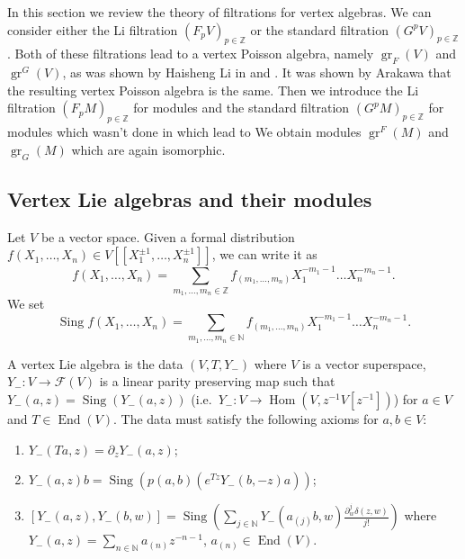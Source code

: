 \documentclass[a4paper, 12pt, reqno]{amsart}
\theoremstyle{remark}
\numberwithin{equation}{subsection}
\DeclareMathOperator{\gr}{gr}
\DeclareMathOperator{\End}{End}
\DeclareMathOperator{\Hom}{Hom}
\DeclareMathOperator{\Sing}{Sing}
\begin{document}
In this section we review the theory of filtrations for vertex algebras.
We can consider either the Li filtration $(F_pV)_{p \in \mathbb{Z}}$ or the standard filtration $(G^pV)_{p \in \mathbb{Z}}$.
Both of these filtrations lead to a vertex Poisson algebra, namely $\gr_F(V)$ and $\gr^G(V)$, as was shown by Haisheng Li in \cite{li_abelianizing_2005} and \cite{li_vertex_2004}.
It was shown by Arakawa \cite{arakawa_remark_2012} that the resulting vertex Poisson algebra is the same.
Then we introduce the Li filtration $(F_pM)_{p \in \mathbb{Z}}$ for modules and the standard filtration $(G^pM)_{p \in \mathbb{Z}}$ for modules which wasn't done in \cite{li_vertex_2004} which lead to 
We obtain modules $\gr^F(M)$ and $\gr_G(M)$ which are again isomorphic.

\subsection{Vertex Lie algebras and their modules}
\label{sec:vert-lie-algebr}

Let $V$ be a vector space.
Given a formal distribution $f(X_1, \dots, X_n) \in V[[X_1^{\pm 1}, \dots, X_n^{\pm 1}]]$, we can write it as
\begin{equation*}
  f(X_1, \dots, X_n) = \sum_{m_1, \dots, m_n \in \mathbb{Z}}f_{(m_1, \dots, m_n)}X_1^{-m_1 - 1}\dots X_n^{-m_n - 1}.
\end{equation*}
We set
\begin{equation*}
  \Sing f(X_1, \dots, X_n) = \sum_{m_1, \dots, m_n \in \mathbb{N}}f_{(m_1, \dots, m_n)}X_1^{-m_1 - 1}\dots X_n^{-m_n - 1}.
\end{equation*}

A vertex Lie algebra is the data $(V, T, Y_-)$ where $V$ is a vector superspace, $Y_-: V \to \mathcal{F}(V)$ is a linear parity preserving map such that $Y_-(a,z) = \Sing(Y_-(a, z))$ (i.e.\ $Y_-: V \to \Hom(V, z^{-1}V[z^{-1}])$) for $a \in V$ and $T \in \End(V)$.
The data must satisfy the following axioms for $a, b \in V$:
\begin{enumerate}
\item $Y_-(Ta, z) = \partial_zY_-(a, z)$;
\item $Y_-(a, z)b = \Sing(p(a, b)(e^{Tz}Y_-(b, -z)a))$;
\item $[Y_-(a, z),Y_-(b, w)] = \Sing(\sum_{j \in \mathbb{N}}Y_-(a_{(j)}b, w)\frac{\partial^j_w\delta(z, w)}{j!})$ where $Y_-(a, z) = \sum_{n \in \mathbb{N}}a_{(n)}z^{-n - 1}$, $a_{(n)} \in \End(V)$.
\end{enumerate}
\end{document}
